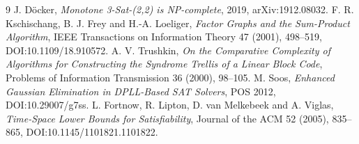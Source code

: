 \documentclass[11pt]{article}
\begin{document}
\begin{thebibliography}{9}
 J. D\"ocker, \emph{Monotone 3-Sat-(2,2) is NP-complete}, 2019, arXiv:1912.08032.
 F. R. Kschischang, B. J. Frey and H.-A. Loeliger, \emph{Factor Graphs and the Sum-Product Algorithm}, IEEE Transactions on Information Theory 47 (2001), 498--519, DOI:10.1109/18.910572.
 A. V. Trushkin, \emph{On the Comparative Complexity of Algorithms for Constructing the Syndrome Trellis of a Linear Block Code}, Problems of Information Transmission 36 (2000), 98--105.
 M. Soos, \emph{Enhanced Gaussian Elimination in DPLL-Based SAT Solvers}, POS 2012, DOI:10.29007/g7ss.
 L. Fortnow, R. Lipton, D. van Melkebeek and A. Viglas, \emph{Time-Space Lower Bounds for Satisfiability}, Journal of the ACM 52 (2005), 835--865, DOI:10.1145/1101821.1101822.
\end{thebibliography}
\end{document}
